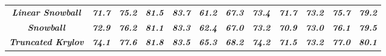 \begin{table*}[htbp]
\begin{tabular}{c|cccc|ccc|cccc}
    \midrule
    \textit{\textbf{Linear Snowball}} & \cellcolor[rgb]{ .455,  .765,  .486}\textit{\textbf{71.7}} & \cellcolor[rgb]{ .486,  .773,  .49}\textit{\textbf{75.2}} & \cellcolor[rgb]{ .427,  .757,  .486}\textit{\textbf{81.5}} & \cellcolor[rgb]{ .388,  .745,  .482}\textit{\textbf{83.7}} & \cellcolor[rgb]{ .514,  .784,  .49}\textit{\textbf{61.2}} & \cellcolor[rgb]{ .455,  .765,  .486}\textit{\textbf{67.3}} & \cellcolor[rgb]{ .478,  .773,  .49}\textit{\textbf{73.4}} & \cellcolor[rgb]{ .388,  .745,  .482}\textit{\textbf{71.7}} & \cellcolor[rgb]{ .396,  .749,  .486}\textit{\textbf{73.2}} & \cellcolor[rgb]{ .584,  .804,  .494}\textit{\textbf{75.7}} & \cellcolor[rgb]{ .627,  .816,  .498}\textit{\textbf{79.2}} \\
    \textit{\textbf{Snowball}} & \cellcolor[rgb]{ .424,  .757,  .486}\textit{\textbf{72.9}} & \cellcolor[rgb]{ .447,  .765,  .486}\textit{\textbf{76.2}} & \cellcolor[rgb]{ .471,  .769,  .49}\textit{\textbf{81.1}} & \cellcolor[rgb]{ .443,  .761,  .486}\textit{\textbf{83.3}} & \cellcolor[rgb]{ .478,  .773,  .49}\textit{\textbf{62.4}} & \cellcolor[rgb]{ .471,  .769,  .49}\textit{\textbf{67.0}} & \cellcolor[rgb]{ .498,  .776,  .49}\textit{\textbf{73.2}} & \cellcolor[rgb]{ .427,  .757,  .486}\textit{\textbf{70.9}} & \cellcolor[rgb]{ .404,  .753,  .486}\textit{\textbf{73.0}} & \cellcolor[rgb]{ .525,  .784,  .49}\textit{\textbf{76.1}} & \cellcolor[rgb]{ .553,  .792,  .494}\textit{\textbf{79.5}} \\
    \textit{\textbf{Truncated Krylov}} & \cellcolor[rgb]{ .388,  .745,  .482}\textit{\textbf{74.1}} & \cellcolor[rgb]{ .388,  .745,  .482}\textit{\textbf{77.6}} & \cellcolor[rgb]{ .388,  .745,  .482}\textit{\textbf{81.8}} & \cellcolor[rgb]{ .412,  .753,  .486}\textit{\textbf{83.5}} & \cellcolor[rgb]{ .388,  .745,  .482}\textit{\textbf{65.3}} & \cellcolor[rgb]{ .388,  .745,  .482}\textit{\textbf{68.2}} & \cellcolor[rgb]{ .388,  .745,  .482}\textit{\textbf{74.2}} & \cellcolor[rgb]{ .404,  .749,  .486}\textit{\textbf{71.5}} & \cellcolor[rgb]{ .388,  .745,  .482}\textit{\textbf{73.2}} & \cellcolor[rgb]{ .388,  .745,  .482}\textit{\textbf{77.0}} & \cellcolor[rgb]{ .388,  .745,  .482}\textit{\textbf{80.1}} \\
    \bottomrule
    \bottomrule
    \end{tabular}%
\label{tab:results_with_validation}%
\end{table*}%
